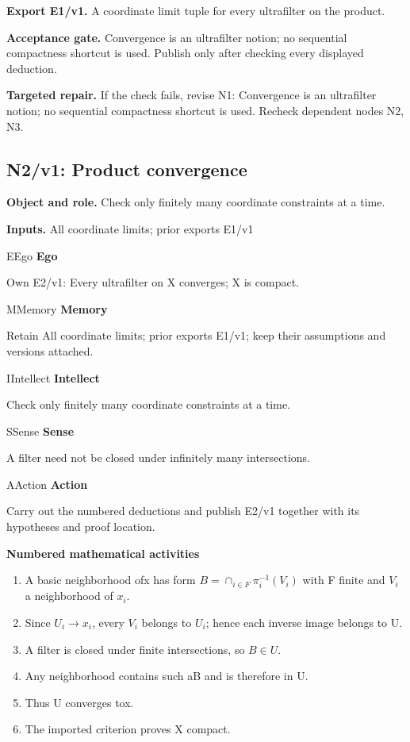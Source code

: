 \documentclass[preprint,12pt,aps,pra,showkeys,amsmath,amssymb,superscriptaddress,floatfix]{revtex4-2}
\theoremstyle{definition}
\theoremstyle{remark}
\newcommand{\mmfaculty}[3]{%
 \begin{mmfacultybox}{#1}{#2}
 {\sffamily\bfseries\color{MMBlue}#2}\par\smallskip #3
 \end{mmfacultybox}}
\newcommand{\field}[2]{\par\smallskip\noindent\textbf{#1.} #2\par}
\begin{document}
\field{Export E1/v1}{A coordinate limit tuple for every ultrafilter on the product.}

\field{Acceptance gate}{Convergence is an ultrafilter notion; no sequential compactness shortcut
is used. Publish only after checking every displayed deduction.}

\field{Targeted repair}{If the check fails, revise N1: Convergence is an ultrafilter notion; no
sequential compactness shortcut is used. Recheck dependent nodes N2, N3.}

\clearpage

\subsection{N2/v1: Product convergence}

\field{Object and role}{Check only finitely many coordinate constraints at a time.}

\field{Inputs}{All coordinate limits; prior exports E1/v1}

\mmfaculty{E}{Ego}{Own E2/v1: Every ultrafilter on X converges; X is compact.}

\mmfaculty{M}{Memory}{Retain All coordinate limits; prior exports E1/v1; keep their
assumptions and versions attached.}

\mmfaculty{I}{Intellect}{Check only finitely many coordinate constraints at a time.}

\mmfaculty{S}{Sense}{A filter need not be closed under infinitely many intersections.}

\mmfaculty{A}{Action}{Carry out the numbered deductions and publish E2/v1 together with its
hypotheses and proof location.}

\smallskip\noindent\textbf{Numbered mathematical activities}

\begin{enumerate}[label=N2.\arabic*,leftmargin=3.4em]

\item A basic neighborhood ofx has form \(B=\cap _{i\in F}\pi _i^{-1}(V_i)\)
with F finite and \(V_i\) a neighborhood of \(x_i\).

\item Since \(U_i\to x_i\), every \(V_i\) belongs to \(U_i\); hence each
inverse image belongs to U.

\item A filter is closed under finite intersections, so \(B\in U\).

\item Any neighborhood contains such aB and is therefore in U.

\item Thus U converges tox.

\item The imported criterion proves X compact.

\end{enumerate}
\end{document}

